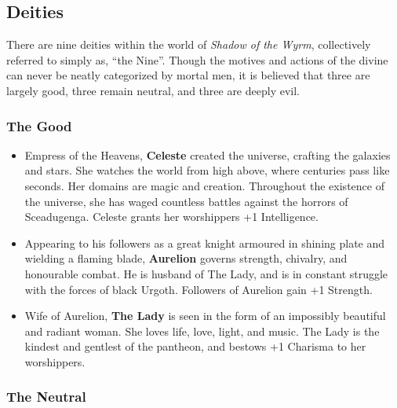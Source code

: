 \subsection{Deities}

There are nine deities within the world of {\it Shadow of the Wyrm}, 
collectively referred to simply as, ``the Nine''.  Though the motives and 
actions of the divine can never be neatly categorized by mortal men, it is 
believed that three are largely good, three remain neutral, and three are 
deeply evil.

\subsubsection{The Good}

\begin{itemize}
\item Empress of the Heavens, {\bf Celeste} created the universe, crafting 
the galaxies and stars.  She watches the world from high above, where 
centuries pass like seconds.  Her domains are magic and creation.  
Throughout the existence of the universe, she has waged countless battles 
against the horrors of Sceadugenga.  Celeste grants her worshippers +1 
Intelligence.

\item Appearing to his followers as a great knight armoured in shining
plate and wielding a flaming blade, {\bf Aurelion} governs strength, 
chivalry, and honourable combat.  He is husband of The Lady, and is in 
constant struggle with the forces of black Urgoth.  Followers of Aurelion 
gain +1 Strength.

\item Wife of Aurelion, {\bf The Lady} is seen in the form of an 
impossibly beautiful and radiant woman.  She loves life, love, light, and 
music.  The Lady is the kindest and gentlest of the pantheon, and bestows 
+1 Charisma to her worshippers.
\end{itemize}

\subsubsection{The Neutral}

